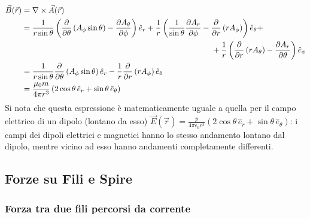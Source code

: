 \begin{equation}
	\begin{split}
		\vec{B}(\vec{r}) &= \nabla\times\vec{A}(\vec{r}) \\
				 &= \displaystyle\frac{1}{r\sin\theta} \left( \displaystyle\frac{\partial}{\partial\theta} \left( A_{\phi} \sin\theta \right) - \displaystyle\frac{\partial A_{\theta}}{\partial\phi} \right) \hat{e}_r + \displaystyle\frac{1}{r} \left( \displaystyle\frac{1}{\sin\theta} \displaystyle\frac{\partial A_r}{\partial\phi} - \displaystyle\frac{\partial}{\partial r} \left(r A_{\phi} \right)\right) \hat{e}_{\theta} + \\ 
				 & \qquad\qquad\qquad\qquad\qquad\qquad\qquad\qquad\qquad\qquad\qquad\qquad + \displaystyle\frac{1}{r} \left(\displaystyle\frac{\partial}{\partial r} \left( r A_{\theta} \right) - \displaystyle\frac{\partial A_r}{\partial\theta} \right) \hat{e}_{\phi} \\ 
				 &= \displaystyle\frac{1}{r\sin\theta}\displaystyle\frac{\partial}{\partial\theta} \left(A_{\phi} \sin\theta\right) \hat{e}_r - \displaystyle\frac{1}{r} \displaystyle\frac{\partial}{\partial r} \left( r A_{\phi} \right) \hat{e}_{\theta} \\ 
				 &= \displaystyle\frac{\mu_0 m}{4\pi r^3} \left(2\cos\theta \,\hat{e}_r + \sin\theta \,\hat{e}_{\theta}\right)
	\end{split}
	\label{eq:}
\end{equation}
Si nota che questa espressione è matematicamente uguale a quella per il campo elettrico di un dipolo (lontano da esso) $ \vec{E}(\vec{r}) = \frac{p}{4\pi\epsilon_0 r^3} \left(2\cos\theta \,\hat{e}_r + \sin\theta \,\hat{e}_{\theta} \right) $: i campi dei dipoli elettrici e magnetici hanno lo stesso andamento lontano dal dipolo, mentre vicino ad esso hanno andamenti completamente differenti.

\subsection{Forze su Fili e Spire}

\subsubsection{Forza tra due fili percorsi da corrente}

